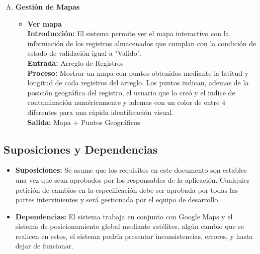 \begin{enumerate}[A.]
      \item \textbf{Gestión de Mapas}
        \begin{itemize}
          \item \textbf{Ver mapa}
          \\ \textbf{Introducción:} El sistema permite ver el mapa interactivo con la información de los registros almacenados que cumplan con la condición de estado de validación igual a "Valido".
          \\ \textbf{Entrada:} Arreglo de Registros 
          \\ \textbf{Proceso:} Mostrar un mapa con puntos obtenidos mediante la latitud y longitud de cada registros del arreglo.
          Los puntos indican, ademas de la posición geográfica del registro, el usuario que lo creó y el indice de contaminación numéricamente y ademas con un color de entre 4 diferentes para una rápida identificación visual.
          \\ \textbf{Salida:} Mapa + Puntos Geográficos
        \end{itemize}

    \end{enumerate}

    \subsection{Suposiciones y Dependencias}
      \begin{itemize}
        \item \textbf{Suposiciones:} Se asume que los requisitos en este documento son estables una vez que sean aprobados por los responsables de la aplicación. Cualquier petición de cambios en la especificación debe ser aprobada por todas las partes intervinientes y será gestionada por el equipo de desarrollo.
        \item \textbf{Dependencias:} El sistema trabaja en conjunto con Google Maps y el sistema de posicionamiento global mediante satélites, algún cambio que se realicen en estos, el sistema podría presentar inconsistencias, errores, y hasta dejar de funcionar.
      \end{itemize}

